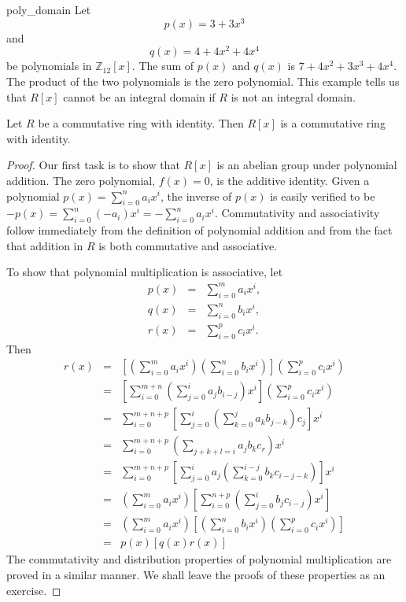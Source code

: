 \begin{example}{poly_domain}
Let
$$
p(x) = 3 + 3 x^3
$$
and
$$
q(x) = 4 + 4 x^2 + 4 x^4
$$
be polynomials in ${\mathbb Z}_{12}[x]$. The sum of $p(x)$ and $q(x)$ is $7 + 4 x^2 + 3 x^3 + 4 x^4$.  The product of the two polynomials is  the zero polynomial.  This example tells us that $R[x]$ cannot be an integral domain if $R$ is not an integral domain.
\mbox{\hspace{1in}}
\end{example}
 
\medskip
 
\begin{theorem}\label{poly_theorem_1}
Let $R$ be a commutative ring with identity.  Then $R[x]$ is a commutative ring with identity.
\end{theorem}

\begin{proof}
Our first task is to show that $R[x]$ is an abelian group under polynomial addition.  The zero polynomial, $f(x) = 0$, is the additive identity.  Given a polynomial $p(x) = \sum_{i = 0}^{n} a_i x^i$, the inverse of $p(x)$ is easily verified to be $-p(x) = \sum_{i = 0}^{n} (-a_i) x^i = -\sum_{i = 0}^{n} a_i x^i$.  Commutativity and associativity follow immediately from the definition of polynomial addition and from the fact that addition in $R$ is both commutative and associative.

To show that polynomial multiplication is associative, let
\begin{eqnarray*}
p(x) & = & \sum_{i=0}^{m} a_i x^i, \\
q(x) & = & \sum_{i=0}^{n} b_i x^i, \\
r(x) & = & \sum_{i=0}^{p} c_i x^i. 
\end{eqnarray*}
Then
\begin{eqnarray*}
[p(x) q(x)] r(x) 
& = &
\left[
\left(
\sum_{i=0}^{m} a_i x^i 
\right)
\left( 
\sum_{i=0}^{n} b_i x^i
\right)
\right]
\left(
\sum_{i=0}^{p} c_i x^i
\right) \\
& = &
\left[
\sum_{i=0}^{m+n}
\left( 
\sum_{j=0}^{i} a_j b_{i-j}
\right) x^i
\right]
\left(
\sum_{i=0}^{p} c_i x^i
\right) \\
& = &
\sum_{i=0}^{m+n+p} 
\left[
\sum_{j=0}^{i}
\left(
\sum_{k=0}^j a_k b_{j-k} 
\right) c_j
\right]
 x^i \\
& = &
\sum_{i=0}^{m+n+p} 
\left(
\sum_{j+k+l=i} a_j b_k c_r
\right) x^i \\
& = &
\sum_{i=0}^{m+n+p}
\left[
\sum_{j=0}^{i} a_j 
\left(
\sum_{k=0}^{i-j} b_k c_{i-j-k}
\right)
\right]  x^i \\
& = &
\left(
\sum_{i=0}^{m} a_i x^i 
\right)
\left[
\sum_{i=0}^{n+p} 
\left(
\sum_{j=0}^{i} b_j c_{i-j}
\right) x^i
\right] \\
& = &
\left(
\sum_{i=0}^{m} a_i x^i 
\right)
\left[
\left( 
\sum_{i=0}^{n} b_i x^i
\right)
\left(
\sum_{i=0}^{p} c_i x^i
\right)
\right] \\
& = & p(x) [ q(x) r(x) ]
\end{eqnarray*}
The commutativity and distribution properties of polynomial multiplication are proved in a similar manner.  We shall leave the proofs of these properties as an exercise.
\end{proof}

